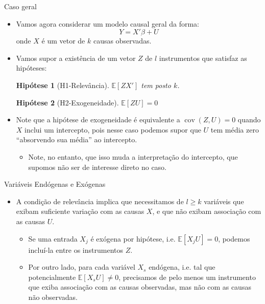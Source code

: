 \documentclass[11pt]{beamer}
\newtheorem{assumption}{Hipótese}
\begin{document}
\begin{frame}{Caso geral}
\begin{itemize}
	\item Vamos agora considerar um modelo causal geral da forma:
$$Y = X'\beta + U$$
onde $X$ é um vetor de $k$ causas observadas.
\item Vamos supor a existência de um vetor $Z$  de $l$ instrumentos que satisfaz as hipóteses:
\begin{assumption}[H1-Relevância]
	$\mathbb{E}[ZX']$ tem posto $k$.
\end{assumption}

\begin{assumption}[H2-Exogeneidade]
	$\mathbb{E}[ZU]=0$
\end{assumption}
\end{itemize}

\begin{itemize}
	\item Note que a hipótese de exogeneidade é equivalente a $\operatorname{cov}(Z,U)=0$ quando $X$ inclui um intercepto, pois nesse caso podemos supor que $U$ tem média zero ``absorvendo sua média'' ao intercepto.
	\begin{itemize}
		\item Note, no entanto, que isso muda a interpretação do intercepto, que supomos não ser de interesse direto no caso.
	\end{itemize}
\end{itemize}

\end{frame}

\begin{frame}{Variáveis Endógenas e Exógenas}
\begin{itemize}
	\item A condição de relevância implica que necessitamos de $l\geq k$ variáveis que exibam suficiente variação com as causas $X$, e que não exibam associação com as causas $U$.
	\begin{itemize}
		\item Se uma entrada $X_j$ é {\color{blue}exógena} por hipótese, i.e. $\mathbb{E}[X_j U] = 0$, podemos incluí-la entre os instrumentos $Z$.
		\item Por outro lado, para cada variável $X_s$  {\color{blue}endógena}, i.e. tal que potencialmente $\mathbb{E}[X_s U] \neq 0$, precisamos de pelo menos um instrumento que exiba associação com as causas observadas, mas não com as causas não observadas.
	\end{itemize}
\end{itemize}
\end{frame}
\end{document}
